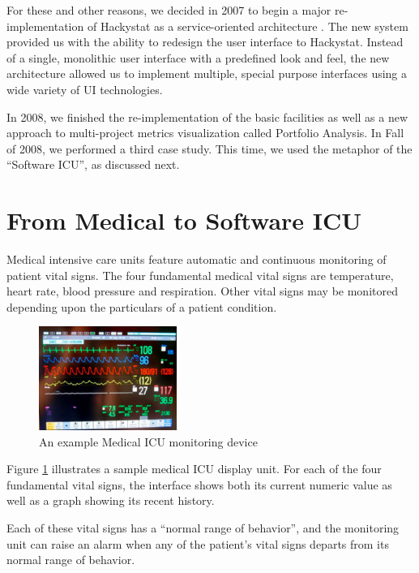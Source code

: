 \documentclass{acm_proc_article-sp}
\begin{document}
For these and other reasons, we decided in 2007 to begin a major
re-implementation of Hackystat as a service-oriented architecture
\cite{csdl2-09-07}. The new system provided us with the ability to redesign
the user interface to Hackystat.  Instead of a single, monolithic user
interface with a predefined look and feel, the new architecture allowed us
to implement multiple, special purpose interfaces using a wide variety of
UI technologies.  

In 2008, we finished the re-implementation of the basic facilities as well
as a new approach to multi-project metrics visualization called Portfolio
Analysis.  In Fall of 2008, we performed a third case study. This time, we used 
the metaphor of the ``Software ICU'', as discussed next.

\section{From Medical to Software ICU}
\label{sec:icu}

Medical intensive care units feature automatic and continuous monitoring of
patient vital signs.  The four fundamental medical vital signs are
temperature, heart rate, blood pressure and respiration.  Other vital signs
may be monitored depending upon the particulars of a patient condition.

\begin{figure}[ht]
  \center
  \includegraphics[width=0.4\textwidth]{micu-screen.eps}
  \caption{An example Medical ICU monitoring device}
  \label{fig:micu}
\end{figure} 

Figure \ref{fig:micu} illustrates a sample medical ICU display unit. For
each of the four fundamental vital signs, the interface shows both its
current numeric value as well as a graph showing its recent history.  

Each of these vital signs has a ``normal range of behavior'', and the
monitoring unit can raise an alarm when any of the patient's vital signs departs
from its normal range of behavior.
\end{document}
